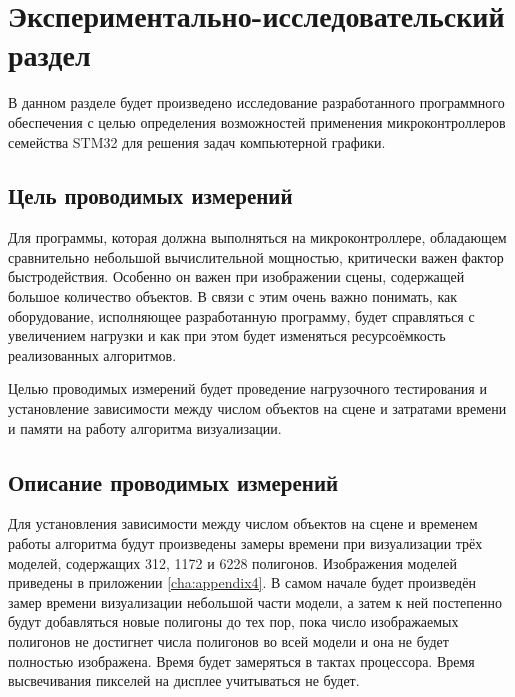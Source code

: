 \chapter{Экспериментально-исследовательский раздел}



В данном разделе будет произведено исследование разработанного программного обеспечения с целью определения возможностей применения 
микроконтроллеров семейства STM32 для решения задач компьютерной графики.

\section{Цель проводимых измерений}
Для программы, которая должна выполняться на микроконтроллере, обладающем сравнительно небольшой вычислительной мощностью, критически 
важен фактор быстродействия. Особенно он важен при изображении сцены, содержащей большое количество объектов. В связи с этим очень 
важно понимать, как оборудование, исполняющее разработанную программу, будет справляться с увеличением нагрузки и как при этом 
будет изменяться ресурсоёмкость реализованных алгоритмов.

Целью проводимых измерений будет проведение нагрузочного тестирования и установление зависимости между числом объектов на сцене и затратами 
времени и памяти на работу алгоритма визуализации.



\section{Описание проводимых измерений}
Для установления зависимости между числом объектов на сцене и временем работы алгоритма будут произведены замеры времени при 
визуализации трёх моделей, содержащих 312, 1172 и 6228 полигонов. Изображения моделей приведены в приложении \ref{cha:appendix4}. 
В самом начале будет произведён замер времени визуализации небольшой части модели, а затем к ней постепенно будут добавляться 
новые полигоны до тех пор, пока число изображаемых полигонов не достигнет числа полигонов во всей модели и она не будет 
полностью изображена. Время будет замеряться в тактах процессора. Время высвечивания пикселей на дисплее учитываться не будет.

